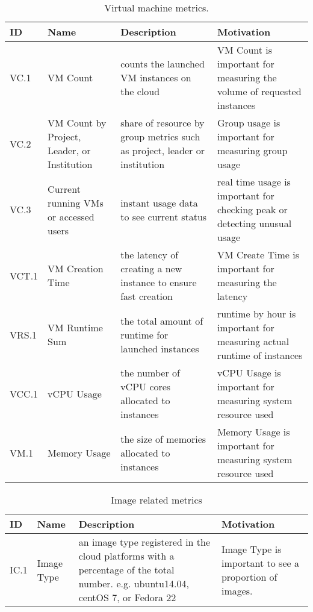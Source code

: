 \begin{table*}[P]
\caption{Virtual machine metrics.}
\begin{scriptsize}
\label{T:metrics}
\bigskip
\begin{center}
\begin{tabular}{lp{}p{}p{}}
\hline
\rowcolor{blue!20} ID & Name & Description & Motivation \\
\hline 
VC.1&
VM Count & 
 counts the launched VM instances on the cloud &
VM Count is important for measuring the volume of requested instances \\
\hline
VC.2&
VM Count by Project, Leader, or Institution &
share of resource by group metrics such as project, leader or institution &
Group usage is important for measuring group usage \\
\hline
VC.3 &
Current running VMs or accessed users &
instant usage data to see current status &
real time usage is important for checking peak or detecting unusual usage \\
\hline
VCT.1 &
VM Creation Time &
the latency of creating a new instance to ensure fast creation &
VM Create Time is important for measuring the latency \\
\hline
VRS.1&
VM Runtime Sum&
the total amount of runtime for launched instances &
runtime by hour is important for measuring actual runtime of instances \\
\hline
VCC.1 &
vCPU Usage &
the number of vCPU cores allocated to instances &
vCPU Usage is important for measuring system resource used \\
\hline
VM.1 &
Memory Usage &
the size of memories allocated to instances &
Memory Usage is important for measuring system resource used \\
\hline
\end{tabular}
\end{center}
\end{scriptsize}
\end{table*}

\begin{table*}[P]
\caption{Image related metrics}
\begin{scriptsize}
\label{T:metrics}
\bigskip
\begin{center}
\begin{tabular}{lp{}p{}p{}}
\hline
\rowcolor{blue!20}  ID & Name & Description & Motivation \\
\hline 
IC.1 &
Image Type &
an image type registered in the cloud platforms with a
percentage of the total number. e.g. ubuntu14.04, centOS 7, or Fedora 22 & 
Image Type is important to see a proportion of images. \\
\hline
\end{tabular}
\end{center}
\end{scriptsize}
\end{table*}

